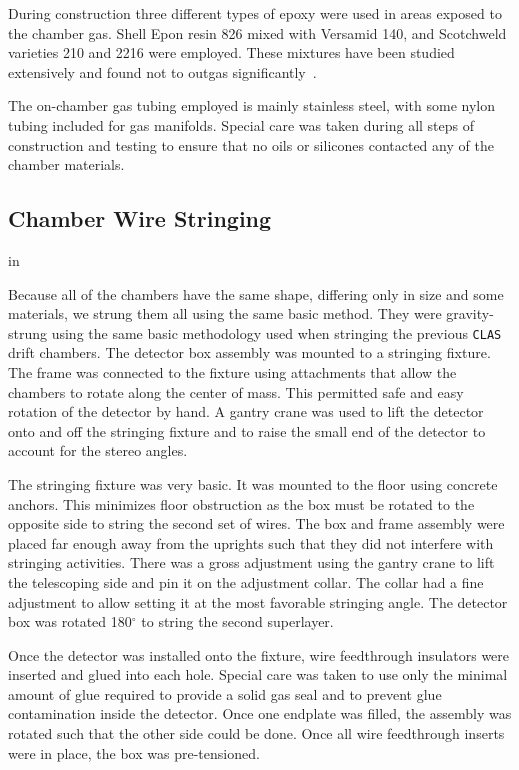 During construction three different types of epoxy were used in areas exposed 
to the chamber gas.  Shell Epon resin 826 mixed with Versamid 140, and 
Scotchweld varieties 210 and 2216 were employed.  These mixtures have been 
studied extensively and found not to outgas significantly~\cite{nasa}.

The on-chamber gas tubing employed is mainly stainless steel, with some
nylon tubing included for gas manifolds.  Special care was taken during
all steps of construction and testing to ensure that no oils or
silicones contacted any of the chamber materials.

\subsection{Chamber Wire Stringing}

 in

Because all of the chambers have the same shape, differing only in
size and some materials, we strung them all using the same basic method.
They were gravity-strung using the same basic methodology 
used when stringing the previous {\tt CLAS} drift chambers.  The detector box 
assembly was mounted to a stringing fixture.  The frame was connected to 
the fixture using attachments that allow the chambers to rotate along 
the center of mass.  This permitted safe and easy 
rotation of the detector by hand.  A gantry crane was used to lift the 
detector onto and off the stringing fixture and to raise the small end of 
the detector to account for the stereo angles.

The stringing fixture was very basic.  It was mounted to the floor using 
concrete anchors.  This minimizes floor obstruction as the box must be 
rotated to the opposite side to string the second set of wires.  The box 
and frame assembly were placed far enough away from the uprights such that 
they did not interfere with stringing activities.  There was a gross 
adjustment using 
the gantry crane to lift the telescoping side and pin it on the adjustment 
collar.  The collar had a fine adjustment to allow setting it at the most 
favorable stringing angle.  The detector box was rotated 180$^\circ$ to 
string the second superlayer.

Once the detector was installed onto the fixture, wire feedthrough 
insulators were inserted and glued into each hole. Special care was 
taken to use only the minimal amount of glue required to provide a solid gas 
seal and to prevent glue contamination inside the detector.  Once one 
endplate was filled, the assembly was rotated such that the other side 
could be done.  Once all wire feedthrough inserts were in place, the box 
was pre-tensioned.

